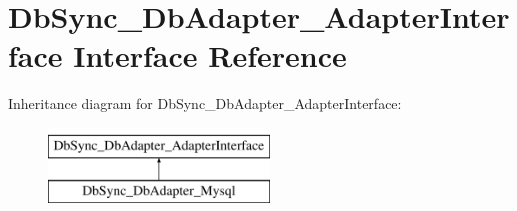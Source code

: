 \hypertarget{interfaceDbSync__DbAdapter__AdapterInterface}{
\section{DbSync\_\-DbAdapter\_\-AdapterInterface Interface Reference}
\label{interfaceDbSync__DbAdapter__AdapterInterface}
}
Inheritance diagram for DbSync\_\-DbAdapter\_\-AdapterInterface:\begin{figure}[H]
\begin{center}
\leavevmode
\includegraphics[height=2.000000cm]{interfaceDbSync__DbAdapter__AdapterInterface}
\end{center}
\end{figure}
